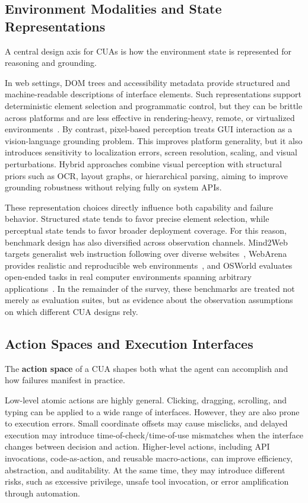 \subsection{Environment Modalities and State Representations}
A central design axis for CUAs is how the environment state is represented for reasoning and grounding.

In web settings, DOM trees and accessibility metadata provide structured and machine-readable descriptions of interface elements. Such representations support deterministic element selection and programmatic control, but they can be brittle across platforms and are less effective in rendering-heavy, remote, or virtualized environments~\cite{zhou2023webarena}. By contrast, pixel-based perception treats GUI interaction as a vision-language grounding problem. This improves platform generality, but it also introduces sensitivity to localization errors, screen resolution, scaling, and visual perturbations. Hybrid approaches combine visual perception with structural priors such as OCR, layout graphs, or hierarchical parsing, aiming to improve grounding robustness without relying fully on system APIs.

These representation choices directly influence both capability and failure behavior. Structured state tends to favor precise element selection, while perceptual state tends to favor broader deployment coverage. For this reason, benchmark design has also diversified across observation channels. Mind2Web targets generalist web instruction following over diverse websites~\cite{deng2023mind2web}, WebArena provides realistic and reproducible web environments~\cite{zhou2023webarena}, and OSWorld evaluates open-ended tasks in real computer environments spanning arbitrary applications~\cite{xie2024osworld}. In the remainder of the survey, these benchmarks are treated not merely as evaluation suites, but as evidence about the observation assumptions on which different CUA designs rely.

\subsection{Action Spaces and Execution Interfaces}
The \textbf{action space} of a CUA shapes both what the agent can accomplish and how failures manifest in practice.

Low-level atomic actions are highly general. Clicking, dragging, scrolling, and typing can be applied to a wide range of interfaces. However, they are also prone to execution errors. Small coordinate offsets may cause misclicks, and delayed execution may introduce time-of-check/time-of-use mismatches when the interface changes between decision and action. Higher-level actions, including API invocations, code-as-action, and reusable macro-actions, can improve efficiency, abstraction, and auditability. At the same time, they may introduce different risks, such as excessive privilege, unsafe tool invocation, or error amplification through automation.

